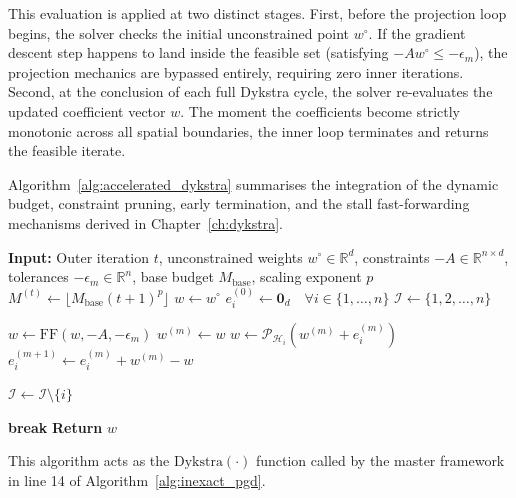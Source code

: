 This evaluation is applied at two distinct stages. First, before the projection loop begins, the solver checks the initial unconstrained point $w^\circ$. If the gradient descent step happens to land inside the feasible set (satisfying $-A w^\circ \le -\epsilon_m$), the projection mechanics are bypassed entirely, requiring zero inner iterations. Second, at the conclusion of each full Dykstra cycle, the solver re-evaluates the updated coefficient vector $w$. The moment the coefficients become strictly monotonic across all spatial boundaries, the inner loop terminates and returns the feasible iterate. 

Algorithm~\ref{alg:accelerated_dykstra} summarises the integration of the dynamic budget, constraint pruning, early termination, and the stall fast-forwarding mechanisms derived in Chapter~\ref{ch:dykstra}.

\begin{algorithm}[H]
\caption{Accelerated Inexact Dykstra Projection}
\label{alg:accelerated_dykstra}
\begin{algorithmic}[1]
\State \textbf{Input:} Outer iteration $t$, unconstrained weights $w^\circ \in \mathbb{R}^d$, constraints $-A \in \mathbb{R}^{n \times d}$, tolerances $-\epsilon_m \in \mathbb{R}^n$, base budget $M_{\mathrm{base}}$, scaling exponent $p$
\State $M^{(t)} \gets \lfloor M_{\mathrm{base}} (t+1)^p \rfloor$ 
\State $w \gets w^\circ$
\State $e_i^{(0)} \gets \mathbf{0}_d \quad \forall i \in \{1, \dots, n\}$ 
\State $\mathcal{I} \gets \{1, 2, \dots, n\}$ 

        \State $w \gets \mathrm{FF}(w, -A, -\epsilon_m)$ 
        \State $w^{(m)} \gets w$
        \State $w \gets \mathcal{P}_{\mathcal{H}_i}(w^{(m)} + e_i^{(m)})$ 
        \State $e_i^{(m+1)} \gets e_i^{(m)} + w^{(m)} - w$ 
        
            \State $\mathcal{I} \gets \mathcal{I} \setminus \{i\}$ 
        \EndIf
    \EndFor
    
        \State \textbf{break} 
    \EndIf
\EndFor
\State \textbf{Return} $w$
\end{algorithmic}
\end{algorithm}

This algorithm acts as the $\mathrm{Dykstra}(\cdot)$ function called by the master framework in line 14 of Algorithm~\ref{alg:inexact_pgd}.